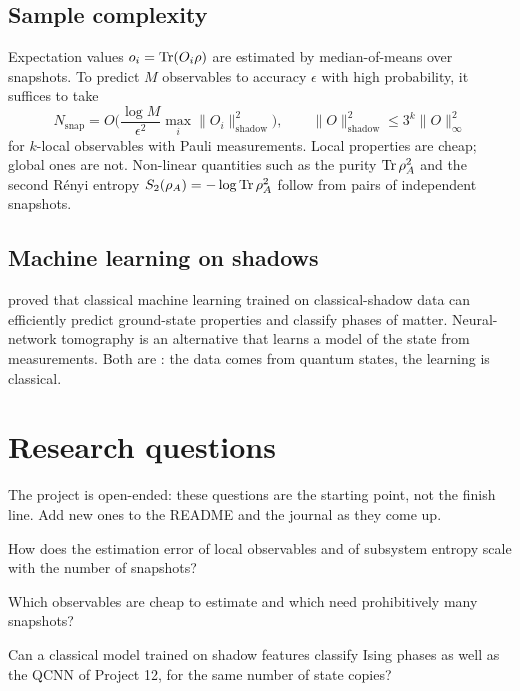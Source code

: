 \documentclass[11pt,a4paper]{article}
\begin{document}
\subsection{Sample complexity}
Expectation values $o_i=\operatorname{Tr}(O_i\rho)$ are estimated by median-of-means over snapshots. To predict $M$
observables to accuracy $\epsilon$ with high probability, it suffices to take
\begin{equation}
  N_{\text{snap}}=O\!\Big(\frac{\log M}{\epsilon^2}\max_i\lVert O_i\rVert_{\text{shadow}}^2\Big),
  \qquad \lVert O\rVert_{\text{shadow}}^2\le 3^k\lVert O\rVert_\infty^2
\end{equation}
for $k$-local observables with Pauli measurements. Local properties are cheap; global ones are not.
Non-linear quantities such as the purity $\operatorname{Tr}\rho_A^2$ and the second R\'enyi entropy
$S_2(\rho_A)=-\log\operatorname{Tr}\rho_A^2$ follow from pairs of independent snapshots.

\subsection{Machine learning on shadows}
\citet{huang2022science377} proved that classical machine learning trained on classical-shadow data
can efficiently predict ground-state properties and classify phases of matter. Neural-network
tomography \citep{torlai2018} is an alternative that learns a model of the state from measurements.
Both are \QC: the data comes from quantum states, the learning is classical.

\section{Research questions}
The project is open-ended: these questions are the starting point, not the finish line. Add new
ones to the README and the journal as they come up.

\begin{rqlist}
  \item How does the estimation error of local observables and of subsystem entropy scale with the number of snapshots?
  \item Which observables are cheap to estimate and which need prohibitively many snapshots?
  \item Can a classical model trained on shadow features classify Ising phases as well as the QCNN of Project 12, for the same number of state copies?
\end{rqlist}
\end{document}
